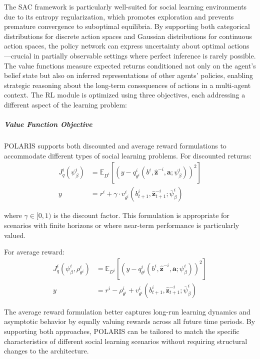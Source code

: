 \documentclass[a4paper,12pt]{report}
\begin{document}
The SAC framework is particularly well-suited for social learning environments due to its entropy regularization, which promotes exploration and prevents premature convergence to suboptimal equilibria. By supporting both categorical distributions for discrete action spaces and Gaussian distributions for continuous action spaces, the policy network can express uncertainty about optimal actions—crucial in partially observable settings where perfect inference is rarely possible. The value functions measure expected returns conditioned not only on the agent's belief state but also on inferred representations of other agents' policies, enabling strategic reasoning about the long-term consequences of actions in a multi-agent context. The RL module is optimized using three objectives, each addressing a different aspect of the learning problem:

\subparagraph{Value Function Objective} POLARIS supports both discounted and average reward formulations to accommodate different types of social learning problems. For discounted returns:
\begin{align}
    J^i_q(\psi^i_{\beta}) & = \mathbb{E}_{D^i}\left[(y - q^i_{\theta^i}(b^i, \boldsymbol{\hat{z}}^{-i}, \boldsymbol{a}; \psi^i_{\beta}))^2\right] \\
    y                     & = r^i + \gamma \cdot v^i_{\theta^i}(b^i_{t+1}, \boldsymbol{\hat{z}}^{-i}_{t+1}; \bar{\psi}^i_{\beta})
\end{align}

where $\gamma \in [0, 1)$ is the discount factor. This formulation is appropriate for scenarios with finite horizons or where near-term performance is particularly valued.

For average reward:
\begin{align}
    J^i_q(\psi^i_{\beta}, \rho^i_{\theta^i}) & = \mathbb{E}_{D^i}\left[(y - q^i_{\theta^i}(b^i, \boldsymbol{\hat{z}}^{-i}, \boldsymbol{a}; \psi^i_{\beta}))^2\right] \\
    y                                        & = r^i - \rho^i_{\theta^i} + v^i_{\theta^i}(b^i_{t+1}, \boldsymbol{\hat{z}}^{-i}_{t+1}; \bar{\psi}^i_{\beta})
\end{align}

The average reward formulation better captures long-run learning dynamics and asymptotic behavior by equally valuing rewards across all future time periods. By supporting both approaches, POLARIS can be tailored to match the specific characteristics of different social learning scenarios without requiring structural changes to the architecture.
\end{document}

